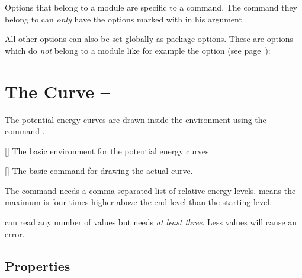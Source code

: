 \documentclass[load-preamble+]{cnltx-doc}
\begin{document}
Options that belong to a module are specific to a command.  The command
 they belong to can \emph{only} have the options marked with
 in his argument .

All other options can also be set globally as package options.  These are
options which do \emph{not} belong to a module like for example the
 option (see page~\pageref{key:debug}):
\begin{sourcecode}
  \usepackage[draft]{endiagram}
\end{sourcecode}

\section{The Curve --  }
The potential energy curves are drawn inside the 
environment using the command .
\begin{environments}
  []
    The basic environment for the potential energy curves
\end{environments}
\begin{commands}
  []
    The basic command for drawing the actual curve.
\end{commands}
The command needs a comma separated list of relative energy levels.
 means the maximum is four times higher above the end
level than the starting level.

\begin{example}
  \begin{endiagram}
  \end{endiagram}
\end{example}

 can read any number of values but needs \emph{at least three}.
Less values will cause an error.
\begin{example}
  \begin{endiagram}
  \end{endiagram}
  \quad
  \begin{endiagram}[scale=.7]
  \end{endiagram}
\end{example}

\subsection{Properties}
\end{document}
